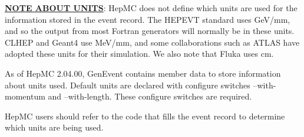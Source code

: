 \documentclass[11pt,letterpaper]{article}
\begin{document}
\underline{\bf NOTE ABOUT UNITS}:
HepMC does not define which units are used for the information stored
in the event record.
The HEPEVT standard uses GeV/mm, and so the output from most Fortran
generators will normally be in these units.
CLHEP and Geant4 use MeV/mm, and some collaborations such as ATLAS
have adopted these units for their simulation.
We also note that Fluka uses cm.

As of HepMC 2.04.00, GenEvent contains member data to store information
about units used.  Default units are declared with configure switches 
--with-momentum and --with-length.  
These configure switches are required.

HepMC users should refer to the code that fills the event record 
to determine which units are being used.

%
%
\end{document}
